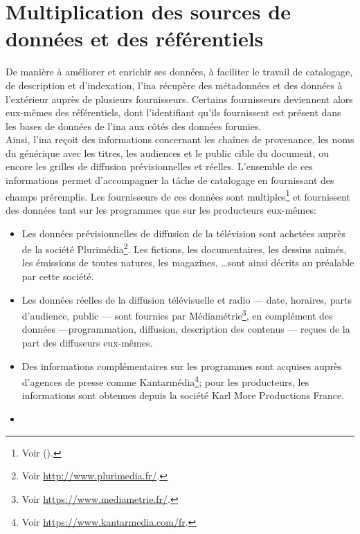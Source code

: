 \section{\label{I-B-3}Multiplication des sources de données et des référentiels}

De manière à améliorer et enrichir ses données, à faciliter le travail de catalogage, de description et d'indexation, l'\ac{ina} récupère des métadonnées et des données à l'extérieur auprès de plusieurs fournisseurs. Certains fournisseurs deviennent alors eux-mêmes des référentiels, dont l'identifiant qu'ils fournissent est présent dans les bases de données de l'\ac{ina} aux côtés des données forunies.\\

Ainsi, l'\ac{ina} reçoit des informations concernant les chaînes de provenance, les noms du générique avec les titres, les audiences et le public cible du document, ou encore les grilles de diffusion prévisionnelles et réelles. L'ensemble de ces informations permet d'accompagner la tâche de catalogage en fournissant des champs préremplis. Les fournisseurs de ces données sont multiples\footnote{Voir  ().} et fournissent des données tant sur les programmes que sur les producteurs eux-mêmes: 
\begin{itemize}
	\item Les données prévisionnelles de diffusion de la télévision sont achetées auprès de la société Plurimédia\footnote{Voir \url{http://www.plurimedia.fr/}.}. Les fictions, les documentaires, les dessins animés, les émissions de toutes natures, les magazines, \dots sont ainsi décrits au préalable par cette société.
	\item Les données réelles de la diffusion télévisuelle et radio --- date, horaires, parts d'audience, public --- sont fournies par Médiamétrie\footnote{Voir \url{https://www.mediametrie.fr/}.}, en complément des données ---programmation, diffusion, description des contenus --- reçues de la part des diffuseurs eux-mêmes.
	\item Des informations complémentaires sur les programmes sont acquises auprès d'agences de presse comme Kantarmédia\footnote{Voir \url{https://www.kantarmedia.com/fr}.}; pour les producteurs, les informations sont obtenues depuis la société Karl More Productions France.
	\item 
\end{itemize}

